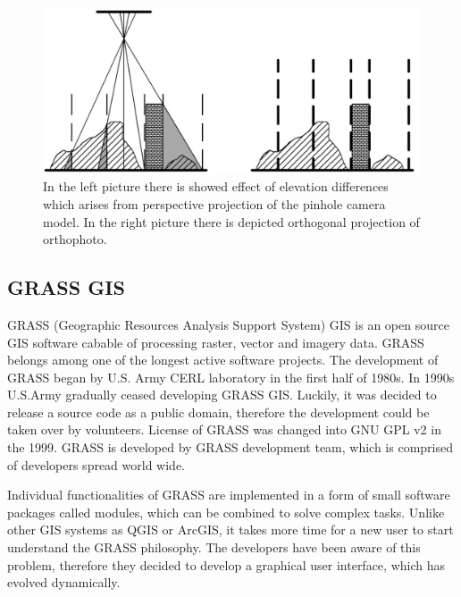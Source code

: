 \documentclass[a4paper,12pt]{article}
\begin{document}

\begin{figure}[h]
    \centering
    \includegraphics[scale=0.2]{figures/orthophoto.png}
    \caption{In the left picture there is showed effect of elevation differences 
    which arises from perspective projection of the pinhole camera model. 
    In the right picture there is depicted orthogonal projection of orthophoto.}
    \label{fig:ortho}
\end{figure}


\subsection{GRASS GIS}


GRASS (Geographic Resources Analysis Support System) GIS is an open source GIS software cabable of processing raster, vector and imagery data. 
GRASS belongs among one of 
the longest active software projects. The development of GRASS began by U.S. Army CERL  laboratory
in the first half of 1980s. In 1990s U.S.Army gradually ceased developing GRASS GIS. Luckily, it was decided to 
release a source code as a public domain, therefore the development could be taken over by volunteers.  License 
of GRASS was changed into GNU GPL v2 in the 1999. GRASS is developed by GRASS development 
team, which is comprised of developers spread world wide. 



Individual functionalities of GRASS are implemented in a form of small software packages called modules, which 
can be combined to solve complex tasks.
Unlike other GIS systems as QGIS or ArcGIS, it takes 
more time for a new user to start understand the GRASS philosophy. The developers 
have been aware of this problem, therefore they decided to develop a graphical user interface, which 
has evolved dynamically.
\end{document}
